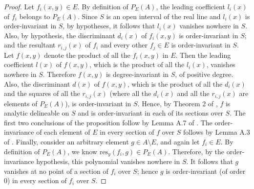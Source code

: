 \documentclass{article}
\begin{document}
\begin{proof}
    Let $f_i(x,y) \in E$. By definition of $P_E(A)$, the leading
    coefficient $l_i(x)$ of $f_i$ belongs to $P_E(A)$.
    Since $S$ is an open interval of the real line
    and $l_i(x)$ is order-invariant in $S$, by hypotheses,
    it follows that $l_i(x)$ vanishes nowhere in $S$.
    Also, by hypothesis, the discriminant $d_i(x)$ of $f_i(x,y)$
    is order-invariant in $S$; and the resultant $r_{i,j}(x)$
    of $f_i$ and every other $f_j \in E$ is order-invariant in $S$.
    Let $f(x,y)$ denote the product of all the $f_i(x,y)$ in $E$.
    Then the leading coefficient $l(x)$ of $f(x,y)$,
    which is the product of all the $l_i(x)$,
    vanishes nowhere in $S$. Therefore $f(x,y)$ is degree-invariant
    in $S$, of positive degree. Also, the discriminant $d(x)$
    of $f(x,y)$, which is the product of all the $d_i(x)$ and
    the squares of all the $r_{i,j}(x)$ 
    (where all the $d_i(x)$ and all the $r_{i,j}(x)$ are elements of
    $P_E(A)$), is order-invariant in $S$. Hence, by Theorem 2 of
    \cite{McCallum1998},
    $f$ is analytic delineable on $S$ and is order-invariant
    in each of its sections over $S$.
    The first two conclusions of the proposition follow
    by Lemma A.7 of \cite{McCallum1988}.
    The order-invariance of each element of $E$ in every section
    of $f$ over $S$ follows by Lemma A.3 of \cite{McCallum1988}.
    Finally, consider an arbitrary element $g \in A \setminus E$,
    and again let $f_i \in E$.
    By definition of $P_E(A)$, we know $\mathrm{res}_y(f_i,g) \in P_E(A)$.
    Therefore, by the order-invariance hypothesis,
    this polynomial vanishes nowhere in $S$.
    It follows that $g$ vanishes at no point of a section of $f_i$
    over $S$; hence $g$ is order-invariant (of order 0)
    in every section of $f_i$ over $S$.
\end{proof}

\end{document}
